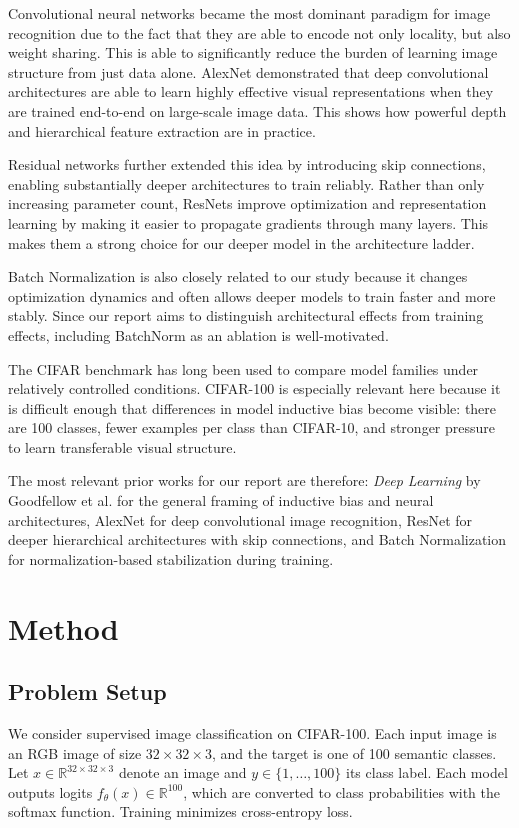 \documentclass{article}
\begin{document}
Convolutional neural networks became the most dominant paradigm for image recognition due to the fact that they are able to encode not only locality, but also weight sharing. This is able to significantly reduce the burden of learning image structure from just data alone. AlexNet demonstrated that deep convolutional architectures are able to learn highly effective visual representations when they are trained end-to-end on large-scale image data. This shows how powerful depth and hierarchical feature extraction are in practice.

Residual networks further extended this idea by introducing skip connections, enabling substantially deeper architectures to train reliably. Rather than only increasing parameter count, ResNets improve optimization and representation learning by making it easier to propagate gradients through many layers. This makes them a strong choice for our deeper model in the architecture ladder.

Batch Normalization is also closely related to our study because it changes optimization dynamics and often allows deeper models to train faster and more stably. Since our report aims to distinguish architectural effects from training effects, including BatchNorm as an ablation is well-motivated.

The CIFAR benchmark has long been used to compare model families under relatively controlled conditions. CIFAR-100 is especially relevant here because it is difficult enough that differences in model inductive bias become visible: there are 100 classes, fewer examples per class than CIFAR-10, and stronger pressure to learn transferable visual structure.

The most relevant prior works for our report are therefore: \textit{Deep Learning} by Goodfellow et al. for the general framing of inductive bias and neural architectures, AlexNet for deep convolutional image recognition, ResNet for deeper hierarchical architectures with skip connections, and Batch Normalization for normalization-based stabilization during training.

\section{Method}

\subsection{Problem Setup}
We consider supervised image classification on CIFAR-100. Each input image is an RGB image of size $32 \times 32 \times 3$, and the target is one of 100 semantic classes. Let $x \in \mathbb{R}^{32\times32\times3}$ denote an image and $y \in \{1,\dots,100\}$ its class label. Each model outputs logits $f_\theta(x) \in \mathbb{R}^{100}$, which are converted to class probabilities with the softmax function. Training minimizes cross-entropy loss.
\end{document}
